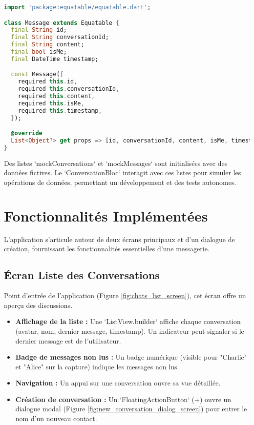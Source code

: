 \documentclass[12pt,a4paper]{article}
\begin{document}
\begin{lstlisting}[language=Dart, caption=Modèle de données `Message` (`message_model.dart`), style=dartstyle]
import 'package:equatable/equatable.dart';

class Message extends Equatable {
  final String id;
  final String conversationId;
  final String content;
  final bool isMe;
  final DateTime timestamp;

  const Message({
    required this.id,
    required this.conversationId,
    required this.content,
    required this.isMe,
    required this.timestamp,
  });

  @override
  List<Object?> get props => [id, conversationId, content, isMe, timestamp];
}
\end{lstlisting}

\begin{infobox}[title=Utilisation des Données Simulées (Mocks)]
Des listes `mockConversations` et `mockMessages` sont initialisées avec des données fictives. Le `ConversationBloc` interagit avec ces listes pour simuler les opérations de données, permettant un développement et des tests autonomes.
\end{infobox}


\section{Fonctionnalités Implémentées}
L'application s'articule autour de deux écrans principaux et d'un dialogue de création, fournissant les fonctionnalités essentielles d'une messagerie.

\subsection{Écran Liste des Conversations}
Point d'entrée de l'application (Figure \ref{fig:chats_list_screen}), cet écran offre un aperçu des discussions.
\begin{itemize}
    \item \textbf{Affichage de la liste :} Une `ListView.builder` affiche chaque conversation (avatar, nom, dernier message, timestamp). Un indicateur peut signaler si le dernier message est de l'utilisateur.
    \item \textbf{Badge de messages non lus :} Un badge numérique (visible pour "Charlie" et "Alice" sur la capture) indique les messages non lus.
    \item \textbf{Navigation :} Un appui sur une conversation ouvre sa vue détaillée.
    \item \textbf{Création de conversation :} Un `FloatingActionButton` (+) ouvre un dialogue modal (Figure \ref{fig:new_conversation_dialog_screen}) pour entrer le nom d'un nouveau contact.
\end{itemize}
\end{document}
